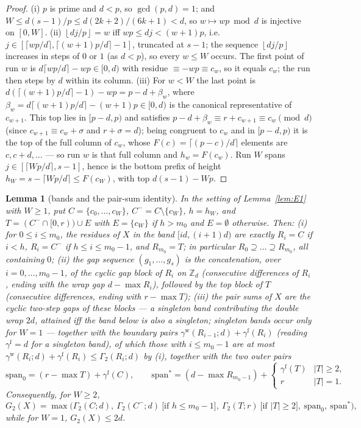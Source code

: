 \documentclass[11pt,a4paper]{article}
\numberwithin{equation}{section}
\theoremstyle{plain}
\newtheorem{lemma}[theorem]{Lemma}
\theoremstyle{definition}
\theoremstyle{remark}
\newcommand{\Z}{\mathbb{Z}}
\newcommand{\floor}[1]{\left\lfloor #1 \right\rfloor}
\begin{document}
\begin{proof}
(i) $p$ is prime and $d<p$, so $\gcd(p,d)=1$; and
$W\le d(s-1)/p\le d(2k+2)/(6k+1)<d$, so $w\mapsto wp\bmod d$ is
injective on $[0,W]$. (ii) $\floor{dj/p}=w$ iff $wp\le dj<(w+1)p$, i.e.\
$j\in[\lceil wp/d\rceil,\lceil(w+1)p/d\rceil-1]$, truncated at $s-1$;
the sequence $\floor{dj/p}$ increases in steps of $0$ or $1$ (as $d<p$),
so every $w\le W$ occurs. The first point of run $w$ is
$d\lceil wp/d\rceil-wp\in[0,d)$ with residue $\equiv-wp\equiv c_w$, so
it equals $c_w$; the run then steps by $d$ within its column. (iii) For
$w<W$ the last point is
$d(\lceil(w{+}1)p/d\rceil-1)-wp=p-d+\beta_w$, where
$\beta_w=d\lceil(w{+}1)p/d\rceil-(w{+}1)p\in[0,d)$ is the canonical
representative of $c_{w+1}$. This top lies in $[p-d,p)$ and satisfies
$p-d+\beta_w\equiv r+c_{w+1}\equiv c_w\pmod d$ (since
$c_{w+1}\equiv c_w+\sigma$ and $r+\sigma=d$); being congruent to $c_w$
and in $[p-d,p)$ it is the top of the full column of $c_w$, whose
$F(c)=\lceil(p-c)/d\rceil$ elements are $c,c+d,\dots$ --- so run $w$ is
that full column and $h_w=F(c_w)$. Run $W$ spans
$j\in[\lceil Wp/d\rceil,s-1]$, hence is the bottom prefix of height
$h_W=s-\lceil Wp/d\rceil\le F(c_W)$, with top $d(s-1)-Wp$.
\end{proof}

\begin{lemma}[bands and the pair-sum identity]\label{lem:E2}
In the setting of Lemma~\ref{lem:E1} with $W\ge1$, put
$C=\{c_0,\dots,c_W\}$, $C^-=C\setminus\{c_W\}$, $h=h_W$, and
$T=(C^-\cap[0,r))\cup E$ with $E=\{c_W\}$ if $h>m_0$ and $E=\emptyset$
otherwise. Then:
\textup{(i)} for $0\le i\le m_0$, the residues of $X$ in the band
$[id,(i{+}1)d)$ are exactly $R_i=C$ if $i<h$, $R_i=C^-$ if
$h\le i\le m_0-1$, and $R_{m_0}=T$; in particular
$R_0\supseteq\dots\supseteq R_{m_0}$, all containing $0$;
\textup{(ii)} the gap sequence $(g_1,\dots,g_s)$ is the concatenation,
over $i=0,\dots,m_0-1$, of the cyclic gap block of $R_i$ on $\Z_d$
(consecutive differences of $R_i$, ending with the wrap gap
$d-\max R_i$), followed by the top block of $T$ (consecutive
differences, ending with $r-\max T$);
\textup{(iii)} the pair sums of $X$ are the cyclic two-step gaps of
these blocks --- a singleton band contributing the double wrap $2d$,
attained iff the band below is also a singleton; singleton bands occur
only for $W=1$ --- together with the boundary pairs
$\gamma^{\mathrm w}(R_{i-1};d)+\gamma^{\mathrm f}(R_i)$ (reading
$\gamma^{\mathrm f}=d$ for a singleton band), of which those with
$i\le m_0-1$ are at most $\gamma^{\mathrm w}(R_i;d)+\gamma^{\mathrm
f}(R_i)\le\Gamma_2(R_i;d)$ by (i), together with the two outer pairs
\[
\mathrm{span}_0=(r-\max T)+\gamma^{\mathrm f}(C),\qquad
\mathrm{span}^\ast=(d-\max R_{m_0-1})+\begin{cases}
\gamma^{\mathrm f}(T)&|T|\ge2,\\ r&|T|=1.\end{cases}
\]
Consequently, for $W\ge2$,
\[
G_2(X)=\max\bigl(\Gamma_2(C;d),\ \Gamma_2(C^-;d)\ \text{[if $h\le
m_0-1$]},\ \Gamma_2(T;r)\ \text{[if $|T|\ge2$]},\
\mathrm{span}_0,\ \mathrm{span}^\ast\bigr),
\]
while for $W=1$, $G_2(X)\le2d$.
\end{lemma}
\end{document}
